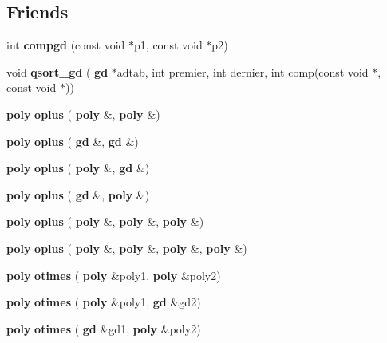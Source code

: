 \subsection*{Friends}
\begin{DoxyCompactItemize}
\item 
\mbox{\label{classmmgd_1_1mmgd_1_1poly_a902bbbf11a23a3fc4075dcd29e9ba0a3}} 
int {\bfseries compgd} (const void $\ast$p1, const void $\ast$p2)
\item 
\mbox{\label{classmmgd_1_1mmgd_1_1poly_a6e11338fa76cb7916e75802534f77587}} 
void {\bfseries qsort\+\_\+gd} (\textbf{ gd} $\ast$adtab, int premier, int dernier, int comp(const void $\ast$, const void $\ast$))
\item 
\mbox{\label{classmmgd_1_1mmgd_1_1poly_abcce92100cdf3208f275859d3908fbe6}} 
\textbf{ poly} {\bfseries oplus} (\textbf{ poly} \&, \textbf{ poly} \&)
\item 
\mbox{\label{classmmgd_1_1mmgd_1_1poly_a247e64e536c6f1a070bc8eb9d870058d}} 
\textbf{ poly} {\bfseries oplus} (\textbf{ gd} \&, \textbf{ gd} \&)
\item 
\mbox{\label{classmmgd_1_1mmgd_1_1poly_a8408c8cbe50239231608be92b6c8b47f}} 
\textbf{ poly} {\bfseries oplus} (\textbf{ poly} \&, \textbf{ gd} \&)
\item 
\mbox{\label{classmmgd_1_1mmgd_1_1poly_a7d137100cfb94e8231c00c253b1c0d45}} 
\textbf{ poly} {\bfseries oplus} (\textbf{ gd} \&, \textbf{ poly} \&)
\item 
\mbox{\label{classmmgd_1_1mmgd_1_1poly_aa457431adea4b51f375222c772dfa926}} 
\textbf{ poly} {\bfseries oplus} (\textbf{ poly} \&, \textbf{ poly} \&, \textbf{ poly} \&)
\item 
\mbox{\label{classmmgd_1_1mmgd_1_1poly_a035bd6940202bdaefbd9f15b65aca4c7}} 
\textbf{ poly} {\bfseries oplus} (\textbf{ poly} \&, \textbf{ poly} \&, \textbf{ poly} \&, \textbf{ poly} \&)
\item 
\mbox{\label{classmmgd_1_1mmgd_1_1poly_adc4c4b3ff5bde03992056d6293de8adc}} 
\textbf{ poly} {\bfseries otimes} (\textbf{ poly} \&poly1, \textbf{ poly} \&poly2)
\item 
\mbox{\label{classmmgd_1_1mmgd_1_1poly_ab6880d5f38b5617b51b536cc12dbe632}} 
\textbf{ poly} {\bfseries otimes} (\textbf{ poly} \&poly1, \textbf{ gd} \&gd2)
\item 
\mbox{\label{classmmgd_1_1mmgd_1_1poly_a48427a3900629c5a386cbc2817f16e55}} 
\textbf{ poly} {\bfseries otimes} (\textbf{ gd} \&gd1, \textbf{ poly} \&poly2)
\item 
\mbox{\label{classmmgd_1_1mmgd_1_1poly_a803937f55e9be138336bd21748fea019}} 

\end{DoxyCompactItemize}
